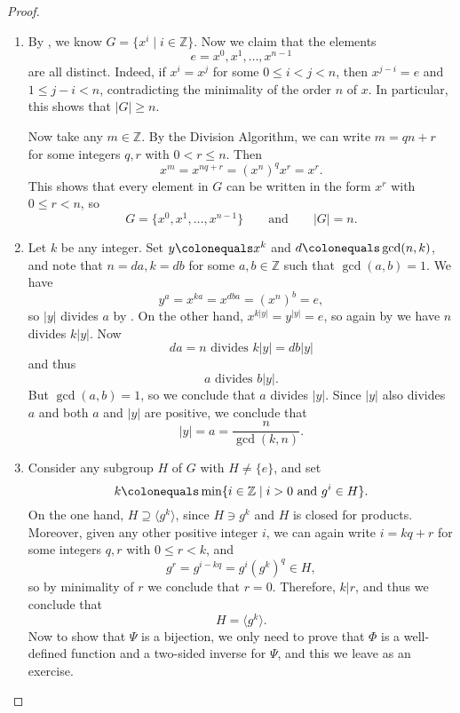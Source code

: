 \documentclass[12pt]{report}
\numberwithin{equation}{section}
\numberwithin{theorem}{chapter}
\theoremstyle{definition}
\newtheorem*{basic properties}{Basic Properties}
\newtheorem*{Important Remark}{Important Remark}
\begin{document}
\begin{proof}
\begin{enumerate}[label=(\alph*)]
\item By , we know $G=\{x^i \mid i \in \mathbb{Z}\}$. Now we claim that the elements 
$$e = x^0, x^1, \dots, x^{n-1}$$ 
are all distinct. Indeed, if $x^i=x^j$ for some $0\leqslant i<j<n$, then $x^{j-i}=e$ and $1 \leqslant j-i<n$, contradicting the minimality of the order $n$ of $x$. In particular, this shows that $|G| \geqslant n$.

Now take any $m \in \mathbb{Z}$. By the Division Algorithm, we can write $m = qn+r$ for some integers $q, r$ with $0 < r \leqslant n$. Then 
$$x^m=x^{nq+r}=(x^n)^qx^r=x^r.$$
This shows that every element in $G$ can be written in the form $x^r$ with $0 \leqslant r < n$, so
$$G = \{x^0, x^1, \dots, x^{n-1}\} \qquad \textrm{and} \qquad |G| = n.$$

\item Let $k$ be any integer. Set $y \colonequals x^k$ and $d \colonequals \gcd(n,k)$, and note that $n=da, k=db$ for some $a,b\in \mathbb{Z}$ such that $\gcd(a,b)=1$. 
We have
$$y^a=x^{ka}=x^{dba}=(x^n)^b=e,$$ 
so $|y|$ divides $a$ by . On the other hand, $x^{k|y|}=y^{|y|}=e$, so again by  we have $n$ divides $k|y|$. 
Now
$$da = n \textrm{ divides } k|y| = db|y|$$
and thus
$$a \textrm{ divides } b|y|.$$
But $\gcd(a,b)=1$, so we conclude that $a$ divides $|y|$.
Since $|y|$ also divides $a$ and both $a$ and $|y|$ are positive, we conclude that 
$$|y|=a=\frac{n}{\gcd(k,n)}.$$


\item Consider any subgroup $H$ of $G$ with $H \neq \{ e \}$, and set 
$$k \colonequals \min \{i \in \mathbb{Z} \mid i>0 \textrm{ and } g^i\in H\}.$$ 
On the one hand, $H \supseteq \langle g^k \rangle$, since $H \ni g^k$ and $H$ is closed for products. Moreover, given any other positive integer $i$, we can again write $i = kq+r$ for some integers $q, r$ with $0 \leqslant r < k$, and
$$g^r = g^{i-kq} = g^i (g^k)^q \in H,$$
so by minimality of $r$ we conclude that $r = 0$. Therefore, $k | r$, and thus we conclude that
$$H = \langle g^k \rangle.$$
Now to show that $\Psi$ is a bijection, we only need to prove that $\Phi$ is a well-defined function and a two-sided inverse for $\Psi$, and this we leave as an exercise.\qedhere
\end{enumerate}
\end{proof}
\end{document}
